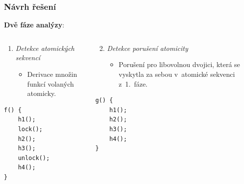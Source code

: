\documentclass[10pt, xcolor=pdflatex, hyperref={unicode}]{beamer}
\begin{document}
\begin{frame}[fragile]\frametitle{Návrh řešení}
	\textbf{Dvě fáze analýzy}:

	\begin{columns}[t]
		\begin{column}{0.5 \linewidth}
			\centering

			\begin{enumerate}
				\item
					\emph{Detekce atomických sekvencí}

					\begin{itemize}
						\setlength\itemsep{0.5em}

						\item
							Derivace množin funkcí volaných
							atomicky.
					\end{itemize}
			\end{enumerate}

			\begin{lstlisting}
f() {
	h1();
	lock();
	h2();
	h3();
	unlock();
	h4();
}
			\end{lstlisting}

		\end{column}

		\begin{column}{0.5 \linewidth}
			\centering

			\begin{enumerate}
				\setcounter{enumi}{1}

				\item
					\emph{Detekce porušení atomicity}

					\begin{itemize}
						\setlength\itemsep{0.5em}

						\item
							Porušení pro libovolnou dvojici, která
							se vyskytla za sebou v~atomické sekvenci
							z~1.~fáze.
					\end{itemize}
			\end{enumerate}

			\begin{lstlisting}
g() {
	h1();
	h2();
	h3();
	h4();
}
			\end{lstlisting}

		\end{column}
	\end{columns}
\end{frame}
\end{document}
